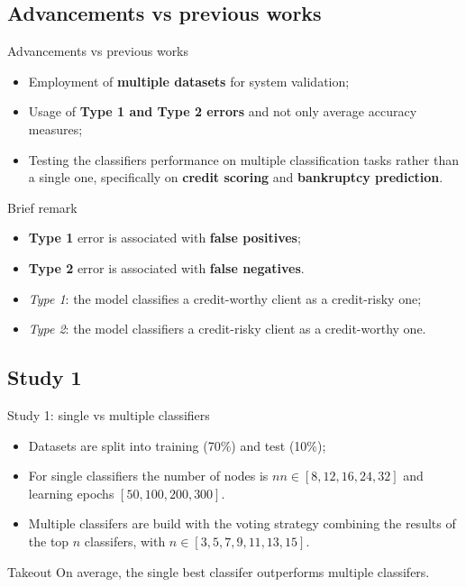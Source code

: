 \documentclass[12pt]{beamer}
\begin{document}
\subsection{Advancements vs previous works}

\begin{frame}{Advancements vs previous works}
  \begin{itemize}
    \item Employment of \textbf{multiple datasets} for system validation;
    \item Usage of \textbf{Type 1 and Type 2 errors} and not only average accuracy measures;
    \item Testing the classifiers performance on multiple classification tasks
      rather than a single one, specifically on \textbf{credit scoring} and \textbf{bankruptcy prediction}.
  \end{itemize}
\end{frame}

\begin{frame}{Brief remark}
\begin{itemize}
\item \textbf{Type 1} error is associated with \textbf{false positives};
\item \textbf{Type 2} error is associated with \textbf{false negatives}.
\end{itemize}

\begin{examples}
  \begin{itemize}
    \item \textit{Type 1}: the model classifies a credit-worthy client as a credit-risky one;
    \item \textit{Type 2}: the model classifiers a credit-risky client as a credit-worthy one.
  \end{itemize}
\end{examples}

\end{frame}

\subsection{Study 1}

\begin{frame}{Study 1: single vs multiple classifiers}
  \begin{itemize}
    \item Datasets are split into training (70\%) and test (10\%);
    \item For single classifiers the number of nodes is $nn \in [8,12,16,24,32]$
      and learning epochs $[50,100,200,300]$.
    \item Multiple classifers are build with the voting strategy combining the results
      of the top $n$ classifers, with $n \in [3,5,7,9,11,13,15]$.
  \end{itemize}
  \begin{block}{Takeout}
  On average, the single best classifer outperforms multiple classifers.
  \end{block}
\end{frame}
\end{document}
